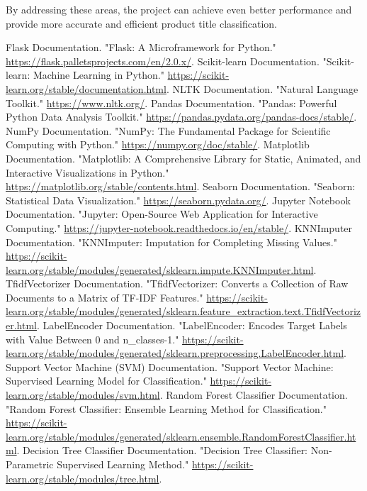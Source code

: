 \documentclass[10pt]{article}
\begin{document}
By addressing these areas, the project can achieve even better performance and provide more accurate and efficient product title classification.

\begin{thebibliography}{99}
     Flask Documentation. "Flask: A Microframework for Python." \url{https://flask.palletsprojects.com/en/2.0.x/}.
     Scikit-learn Documentation. "Scikit-learn: Machine Learning in Python." \url{https://scikit-learn.org/stable/documentation.html}.
     NLTK Documentation. "Natural Language Toolkit." \url{https://www.nltk.org/}.
     Pandas Documentation. "Pandas: Powerful Python Data Analysis Toolkit." \url{https://pandas.pydata.org/pandas-docs/stable/}.
     NumPy Documentation. "NumPy: The Fundamental Package for Scientific Computing with Python." \url{https://numpy.org/doc/stable/}.
     Matplotlib Documentation. "Matplotlib: A Comprehensive Library for Static, Animated, and Interactive Visualizations in Python." \url{https://matplotlib.org/stable/contents.html}.
     Seaborn Documentation. "Seaborn: Statistical Data Visualization." \url{https://seaborn.pydata.org/}.
     Jupyter Notebook Documentation. "Jupyter: Open-Source Web Application for Interactive Computing." \url{https://jupyter-notebook.readthedocs.io/en/stable/}.
     KNNImputer Documentation. "KNNImputer: Imputation for Completing Missing Values." \url{https://scikit-learn.org/stable/modules/generated/sklearn.impute.KNNImputer.html}.
     TfidfVectorizer Documentation. "TfidfVectorizer: Converts a Collection of Raw Documents to a Matrix of TF-IDF Features." \url{https://scikit-learn.org/stable/modules/generated/sklearn.feature_extraction.text.TfidfVectorizer.html}.
     LabelEncoder Documentation. "LabelEncoder: Encodes Target Labels with Value Between 0 and n\_classes-1." \url{https://scikit-learn.org/stable/modules/generated/sklearn.preprocessing.LabelEncoder.html}.
     Support Vector Machine (SVM) Documentation. "Support Vector Machine: Supervised Learning Model for Classification." \url{https://scikit-learn.org/stable/modules/svm.html}.
     Random Forest Classifier Documentation. "Random Forest Classifier: Ensemble Learning Method for Classification." \url{https://scikit-learn.org/stable/modules/generated/sklearn.ensemble.RandomForestClassifier.html}.
     Decision Tree Classifier Documentation. "Decision Tree Classifier: Non-Parametric Supervised Learning Method." \url{https://scikit-learn.org/stable/modules/tree.html}.

\end{thebibliography}
\end{document}

